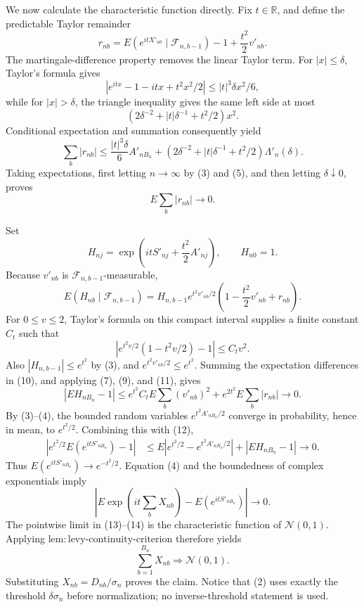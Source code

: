 We now calculate the characteristic function directly. Fix \(t\in\mathbb R\), and define the predictable Taylor remainder
\[
r_{nb}=E(e^{itX'_{nb}}\mid\mathcal F_{n,b-1})-1+\frac{t^2}{2}v'_{nb}.
\]
The martingale-difference property removes the linear Taylor term. For \(|x|\le\delta\), Taylor's formula gives
\[
|e^{itx}-1-itx+t^2x^2/2|\le |t|^3\delta x^2/6,
\]
while for \(|x|>\delta\), the triangle inequality gives the same left side at most
\[
\left(2\delta^{-2}+|t|\delta^{-1}+t^2/2\right)x^2.
\]
Conditional expectation and summation consequently yield
\[
\sum_b|r_{nb}|
\le \frac{|t|^3\delta}{6}A'_{nB_n}
+\left(2\delta^{-2}+|t|\delta^{-1}+t^2/2\right)\Lambda'_n(\delta).
\tag{8}
\]
Taking expectations, first letting \(n\to\infty\) by (3) and (5), and then letting \(\delta\downarrow0\), proves
\[
E\sum_b|r_{nb}|\longrightarrow0.
\tag{9}
\]

Set
\[
H_{nj}=\exp\!\left(itS'_{nj}+\frac{t^2}{2}A'_{nj}\right),
\qquad H_{n0}=1.
\]
Because \(v'_{nb}\) is \(\mathcal F_{n,b-1}\)-measurable,
\[
E(H_{nb}\mid\mathcal F_{n,b-1})
=H_{n,b-1}e^{t^2v'_{nb}/2}
\left(1-\frac{t^2}{2}v'_{nb}+r_{nb}\right).
\tag{10}
\]
For \(0\le v\le2\), Taylor's formula on this compact interval supplies a finite constant \(C_t\) such that
\[
\left|e^{t^2v/2}(1-t^2v/2)-1\right|\le C_tv^2.
\tag{11}
\]
Also \(|H_{n,b-1}|\le e^{t^2}\) by (3), and \(e^{t^2v'_{nb}/2}\le e^{t^2}\). Summing the expectation differences in (10), and applying (7), (9), and (11), gives
\[
|EH_{nB_n}-1|
\le e^{t^2}C_tE\sum_b(v'_{nb})^2
+e^{2t^2}E\sum_b|r_{nb}|
\longrightarrow0.
\tag{12}
\]
By (3)--(4), the bounded random variables \(e^{t^2A'_{nB_n}/2}\) converge in probability, hence in mean, to \(e^{t^2/2}\). Combining this with (12),
\[
\begin{aligned}
\left|e^{t^2/2}E(e^{itS'_{nB_n}})-1\right|
&\le E\left|e^{t^2/2}-e^{t^2A'_{nB_n}/2}\right|
+|EH_{nB_n}-1|\longrightarrow0.
\end{aligned}
\tag{13}
\]
Thus \(E(e^{itS'_{nB_n}})\to e^{-t^2/2}\). Equation (4) and the boundedness of complex exponentials imply
\[
\left|E\exp\!\left(it\sum_bX_{nb}\right)-E(e^{itS'_{nB_n}})\right|\longrightarrow0.
\tag{14}
\]
The pointwise limit in (13)--(14) is the characteristic function of \(\mathcal N(0,1)\). Applying \(\mathrm{lem:levy\text{-}continuity\text{-}criterion}\) therefore yields
\[
\sum_{b=1}^{B_n}X_{nb}\Rightarrow\mathcal N(0,1).
\]
Substituting \(X_{nb}=D_{nb}/\sigma_n\) proves the claim. Notice that (2) uses exactly the threshold \(\delta\sigma_n\) before normalization; no inverse-threshold statement is used.